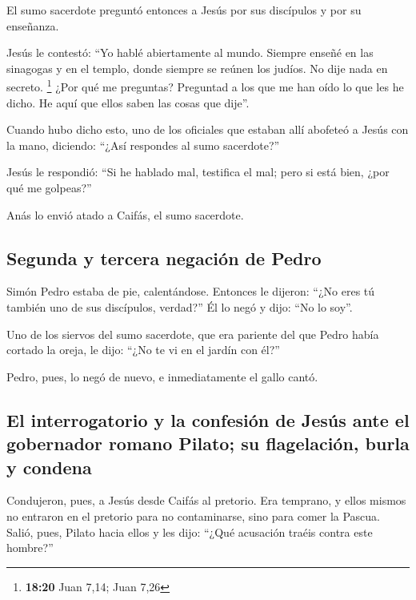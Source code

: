  El sumo sacerdote preguntó entonces a Jesús por sus
discípulos y por su enseñanza.

 Jesús le contestó: ``Yo hablé abiertamente al mundo.
Siempre enseñé en las sinagogas y en el templo, donde siempre se reúnen
los judíos. No dije nada en secreto. \footnote{\textbf{18:20} Juan 7,14;
  Juan 7,26}  ¿Por qué me preguntas? Preguntad a los que
me han oído lo que les he dicho. He aquí que ellos saben las cosas que
dije''.

 Cuando hubo dicho esto, uno de los oficiales que estaban
allí abofeteó a Jesús con la mano, diciendo: ``¿Así respondes al sumo
sacerdote?''

 Jesús le respondió: ``Si he hablado mal, testifica el
mal; pero si está bien, ¿por qué me golpeas?''

 Anás lo envió atado a Caifás, el sumo sacerdote.

\hypertarget{segunda-y-tercera-negaciuxf3n-de-pedro}{%
\subsection{Segunda y tercera negación de
Pedro}\label{segunda-y-tercera-negaciuxf3n-de-pedro}}

 Simón Pedro estaba de pie, calentándose. Entonces le
dijeron: ``¿No eres tú también uno de sus discípulos, verdad?'' Él lo
negó y dijo: ``No lo soy''.

 Uno de los siervos del sumo sacerdote, que era pariente
del que Pedro había cortado la oreja, le dijo: ``¿No te vi en el jardín
con él?''

 Pedro, pues, lo negó de nuevo, e inmediatamente el gallo
cantó.

\hypertarget{el-interrogatorio-y-la-confesiuxf3n-de-jesuxfas-ante-el-gobernador-romano-pilato-su-flagelaciuxf3n-burla-y-condena}{%
\subsection{El interrogatorio y la confesión de Jesús ante el gobernador
romano Pilato; su flagelación, burla y
condena}\label{el-interrogatorio-y-la-confesiuxf3n-de-jesuxfas-ante-el-gobernador-romano-pilato-su-flagelaciuxf3n-burla-y-condena}}

 Condujeron, pues, a Jesús desde Caifás al pretorio. Era
temprano, y ellos mismos no entraron en el pretorio para no
contaminarse, sino para comer la Pascua.  Salió, pues,
Pilato hacia ellos y les dijo: ``¿Qué acusación traéis contra este
hombre?''

